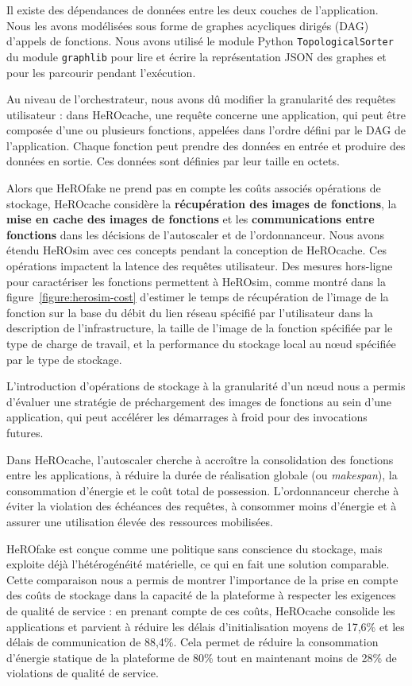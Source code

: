 Il existe des dépendances de données entre les deux couches de l'application. Nous les avons modélisées sous forme de graphes acycliques dirigés (\gls{DAG}) d'appels de fonctions. Nous avons utilisé le module Python \texttt{TopologicalSorter} du module \texttt{graphlib} pour lire et écrire la représentation \gls{JSON} des graphes et pour les parcourir pendant l'exécution.

Au niveau de l'orchestrateur, nous avons dû modifier la granularité des requêtes utilisateur : dans HeROcache, une requête concerne une application, qui peut être composée d'une ou plusieurs fonctions, appelées dans l'ordre défini par le \gls{DAG} de l'application. Chaque fonction peut prendre des données en entrée et produire des données en sortie. Ces données sont définies par leur taille en octets.

Alors que HeROfake ne prend pas en compte les coûts associés opérations de stockage, HeROcache considère la \textbf{récupération des images de fonctions}, la \textbf{mise en cache des images de fonctions} et les \textbf{communications entre fonctions} dans les décisions de l'autoscaler et de l'ordonnanceur. Nous avons étendu HeROsim avec ces concepts pendant la conception de HeROcache. Ces opérations impactent la latence des requêtes utilisateur. Des mesures hors-ligne pour caractériser les fonctions permettent à HeROsim, comme montré dans la figure~\ref{figure:herosim-cost} d'estimer le temps de récupération de l'image de la fonction sur la base du débit du lien réseau spécifié par l'utilisateur dans la description de l'infrastructure, la taille de l'image de la fonction spécifiée par le type de charge de travail, et la performance du stockage local au nœud spécifiée par le type de stockage.

L'introduction d'opérations de stockage à la granularité d'un nœud nous a permis d'évaluer une stratégie de préchargement des images de fonctions au sein d'une application, qui peut accélérer les démarrages à froid pour des invocations futures.

Dans HeROcache, l'autoscaler cherche à accroître la consolidation des fonctions entre les applications, à réduire la durée de réalisation globale (ou \textit{makespan}), la consommation d'énergie et le coût total de possession. L'ordonnanceur cherche à éviter la violation des échéances des requêtes, à consommer moins d'énergie et à assurer une utilisation élevée des ressources mobilisées.

HeROfake est conçue comme une politique sans conscience du stockage, mais exploite déjà l'hétérogénéité matérielle, ce qui en fait une solution comparable. Cette comparaison nous a permis de montrer l'importance de la prise en compte des coûts de stockage dans la capacité de la plateforme à respecter les exigences de qualité de service : en prenant compte de ces coûts, HeROcache consolide les applications et parvient à réduire les délais d'initialisation moyens de 17,6\% et les délais de communication de 88,4\%. Cela permet de réduire la consommation d'énergie statique de la plateforme de 80\% tout en maintenant moins de 28\% de violations de qualité de service.

